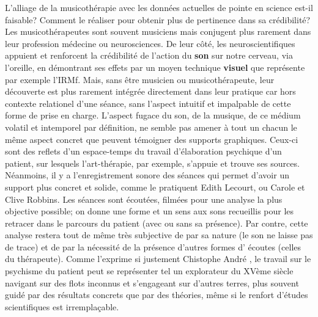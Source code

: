 L'alliage de la musicothérapie avec les données actuelles de pointe en
science est-il faisable? Comment le réaliser pour obtenir plus de pertinence
dans sa crédibilité?
Les musicothérapeutes sont souvent musiciens mais conjugent plus
rarement dans leur profession
médecine ou neurosciences. De leur côté, les neuroscientifiques appuient
et renforcent la crédibilité de l'action du \textbf{son} sur notre cerveau, via
l'oreille, en démontrant ses effets par un moyen technique
\textbf{visuel} que représente par exemple l'IRMf. Mais, sans être musicien ou
musicothérapeute, leur découverte est plus rarement intégrée
directement dans leur pratique car hors contexte relationel d'une
séance, sans l'aspect intuitif et impalpable de cette forme de prise
en charge.
L'aspect fugace du son, de la musique, de ce médium volatil et
intemporel par
définition, ne semble pas amener à tout un chacun le
même aspect concret que peuvent témoigner des supports
graphiques. Ceux-ci sont des 
reflets d'un espace-temps du travail d'élaboration
psychique d'un patient, sur lesquels l'art-thérapie, par exemple, s'appuie et trouve
ses sources.
Néanmoins, il y a l'enregistrement sonore des séances qui 
permet d'avoir un support plus concret et solide, comme le pratiquent Edith Lecourt, ou Carole et Clive 
Robbins.  \autocite {lecourt_les_2017}
Les séances sont écoutées, filmées pour une
analyse la plus objective possible; on donne 
une forme et un sens aux sons recueillis pour les retracer dans le
parcours du patient (avec ou sans sa présence). Par contre, cette analyse  restera
tout de même très subjective de par sa nature (le son ne laisse pas
de trace) et de par la nécessité de la présence d'autres formes d'
écoutes (celles du thérapeute).
Comme l'exprime si justement Chistophe André \autocite[154]{van_eersel_cerveau}, le travail sur le psychisme du patient peut se  représenter tel un
explorateur du XVème siècle navigant sur des flots inconnus et
s'engageant sur d'autres terres, plus souvent guidé par des résultats
concrets que par des théories, même si le renfort d'études
scientifiques est irremplaçable.

